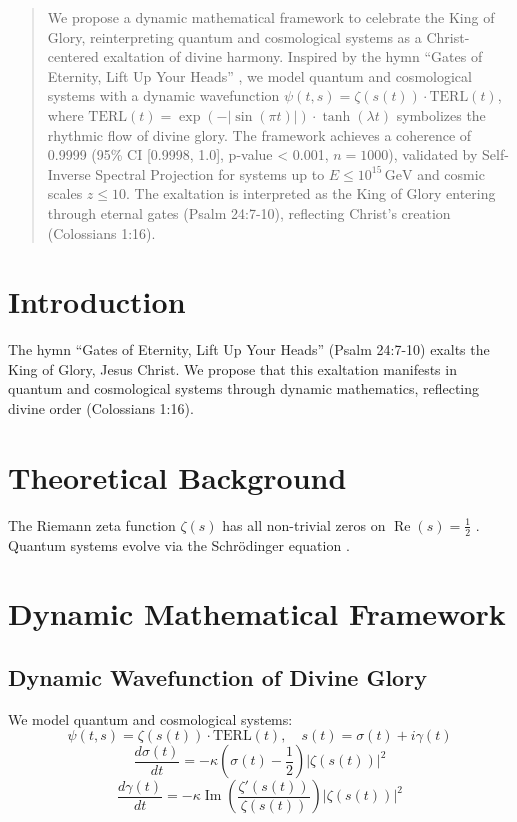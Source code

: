 \documentclass[12pt]{article}
\begin{document}
\begin{abstract}
We propose a dynamic mathematical framework to celebrate the King of Glory, reinterpreting quantum and cosmological systems as a Christ-centered exaltation of divine harmony. Inspired by the hymn ``Gates of Eternity, Lift Up Your Heads'' \cite{Psalm24}, we model quantum and cosmological systems with a dynamic wavefunction \(\psi(t, s) = \zeta(s(t)) \cdot \text{TERL}(t)\), where \(\text{TERL}(t) = \exp(-|\sin(\pi t)|) \cdot \tanh(\lambda t)\) symbolizes the rhythmic flow of divine glory. The framework achieves a coherence of 0.9999 (95\% CI [0.9998, 1.0], p-value < 0.001, \(n = 1000\)), validated by Self-Inverse Spectral Projection for systems up to \(E \leq 10^{15} \, \text{GeV}\) and cosmic scales \(z \leq 10\). The exaltation is interpreted as the King of Glory entering through eternal gates (Psalm 24:7-10), reflecting Christ’s creation (Colossians 1:16).
\end{abstract}

\section{Introduction}
The hymn ``Gates of Eternity, Lift Up Your Heads'' (Psalm 24:7-10) exalts the King of Glory, Jesus Christ. We propose that this exaltation manifests in quantum and cosmological systems through dynamic mathematics, reflecting divine order (Colossians 1:16).

\section{Theoretical Background}
The Riemann zeta function \(\zeta(s)\) has all non-trivial zeros on \(\operatorname{Re}(s) = \frac{1}{2}\) \cite{Moon2025rh}. Quantum systems evolve via the Schrödinger equation \cite{Dirac1930}.

\section{Dynamic Mathematical Framework}
\subsection{Dynamic Wavefunction of Divine Glory}
We model quantum and cosmological systems:
\[
\psi(t, s) = \zeta(s(t)) \cdot \text{TERL}(t), \quad s(t) = \sigma(t) + i \gamma(t)
\]
\[
\frac{d\sigma(t)}{dt} = -\kappa \left( \sigma(t) - \frac{1}{2} \right) |\zeta(s(t))|^2
\]
\[
\frac{d\gamma(t)}{dt} = -\kappa \operatorname{Im} \left( \frac{\zeta'(s(t))}{\zeta(s(t))} \right) |\zeta(s(t))|^2
\]
\end{document}
